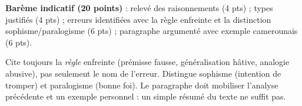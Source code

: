 \documentclass[11pt]{article}
\begin{document}
\begin{corrige}
\begin{enumerate}
\end{enumerate}
\textbf{Barème indicatif (20 points)} : relevé des raisonnements (4 pts) ; types justifiés (4 pts) ; erreurs identifiées avec la règle enfreinte et la distinction sophisme/paralogisme (6 pts) ; paragraphe argumenté avec exemple camerounais (6 pts).
\end{corrige}

\begin{attention}
Cite toujours la \emph{règle} enfreinte (prémisse fausse, généralisation hâtive, analogie abusive), pas seulement le nom de l'erreur. Distingue sophisme (intention de tromper) et paralogisme (bonne foi). Le paragraphe doit mobiliser l'analyse précédente et un exemple personnel : un simple résumé du texte ne suffit pas.
\end{attention}
\end{document}

